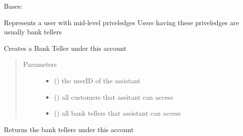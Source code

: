 \documentclass[letterpaper,10pt,english]{sphinxmanual}
\begin{document}
\begin{fulllineitems}
\label{\detokenize{sample:sample.assistant.Assistant}}
Bases: 

Represents a user with mid-level priveledges
Users having these priveledges are usually bank tellers

\begin{fulllineitems}
\label{\detokenize{sample:sample.assistant.Assistant.createBankTeller}}
Creates a Bank Teller under this account
\begin{quote}\begin{description}
\item[{Parameters}] \leavevmode\begin{itemize}
\item {} 
 () \textendash{} the userID of the assistant

\item {} 
 () \textendash{} all customers that assitant can access

\item {} 
 () \textendash{} all bank tellers that assistant can access

\end{itemize}

\end{description}\end{quote}

\end{fulllineitems}


\begin{fulllineitems}
\label{\detokenize{sample:sample.assistant.Assistant.viewBankTellers}}
Returns the bank tellers under this account

\end{fulllineitems}


\end{fulllineitems}
\end{document}
